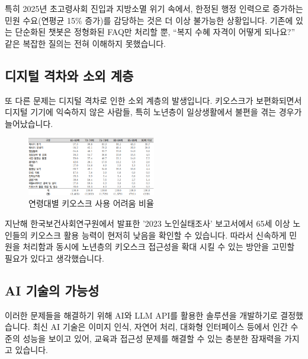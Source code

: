 특히 2025년 초고령사회 진입과 지방소멸 위기 속에서, 한정된 행정 인력으로 증가하는 민원 수요(연평균 15\% 증가)를 감당하는 것은 더 이상 불가능한 상황입니다. 기존에 있는 단순화된 챗봇은 정형화된 FAQ만 처리할 뿐, ``복지 수혜 자격이 어떻게 되나요?'' 같은 복잡한 질의는 전혀 이해하지 못했습니다.

\subsection{디지털 격차와 소외 계층}

또 다른 문제는 디지털 격차로 인한 소외 계층의 발생입니다. 키오스크가 보편화되면서 디지털 기기에 익숙하지 않은 사람들, 특히 노년층이 일상생활에서 불편을 겪는 경우가 늘어났습니다.

\begin{figure}[H]
    \centering
    \includegraphics[width=0.5\textwidth]{1/image4.png}
    \caption{연령대별 키오스크 사용 어려움 비율}
    \label{fig:digital_divide}
\end{figure}
 지난해 한국보건사회연구원에서 발표한 '2023 노인실태조사' 보고서에서 65세 이상 노인들의 키오스크 활용 능력이 현저히 낮음을 확인할 수 있습니다.
 따라서 신속하게 민원을 처리함과 동시에 노년층의 키오스크 접근성을 확대 시킬 수 있는 방안을 고민할 필요가 있다고 생각했습니다.
 
\subsection{AI 기술의 가능성}

이러한 문제들을 해결하기 위해 AI와 LLM API를 활용한 솔루션을 개발하기로 결정했습니다. 최신 AI 기술은 이미지 인식, 자연어 처리, 대화형 인터페이스 등에서 인간 수준의 성능을 보이고 있어, 교육과 접근성 문제를 해결할 수 있는 충분한 잠재력을 가지고 있습니다.